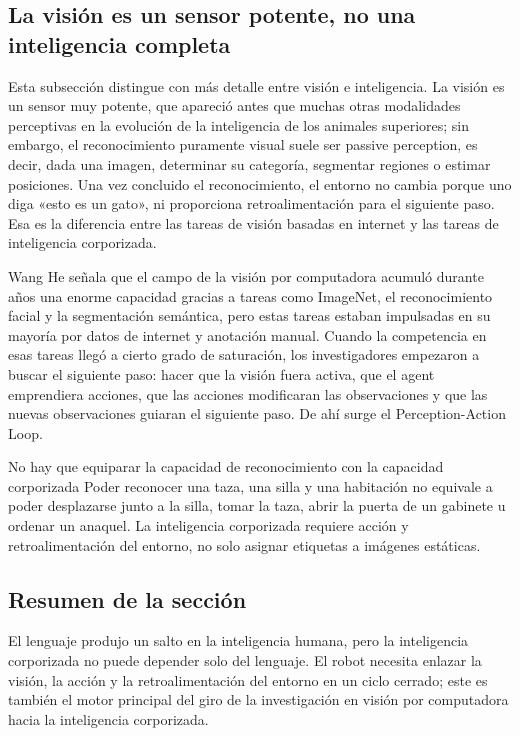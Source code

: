 \subsection{La visión es un sensor potente, no una inteligencia completa}

Esta subsección distingue con más detalle entre visión e inteligencia. La visión es un sensor muy potente, que apareció antes que muchas otras modalidades perceptivas en la evolución de la inteligencia de los animales superiores; sin embargo, el reconocimiento puramente visual suele ser passive perception, es decir, dada una imagen, determinar su categoría, segmentar regiones o estimar posiciones. Una vez concluido el reconocimiento, el entorno no cambia porque uno diga «esto es un gato», ni proporciona retroalimentación para el siguiente paso. Esa es la diferencia entre las tareas de visión basadas en internet y las tareas de inteligencia corporizada.

Wang He señala que el campo de la visión por computadora acumuló durante años una enorme capacidad gracias a tareas como ImageNet, el reconocimiento facial y la segmentación semántica, pero estas tareas estaban impulsadas en su mayoría por datos de internet y anotación manual. Cuando la competencia en esas tareas llegó a cierto grado de saturación, los investigadores empezaron a buscar el siguiente paso: hacer que la visión fuera activa, que el agent emprendiera acciones, que las acciones modificaran las observaciones y que las nuevas observaciones guiaran el siguiente paso. De ahí surge el Perception-Action Loop.

\begin{warningbox}{No hay que equiparar la capacidad de reconocimiento con la capacidad corporizada}
Poder reconocer una taza, una silla y una habitación no equivale a poder desplazarse junto a la silla, tomar la taza, abrir la puerta de un gabinete u ordenar un anaquel. La inteligencia corporizada requiere acción y retroalimentación del entorno, no solo asignar etiquetas a imágenes estáticas.
\end{warningbox}

\subsection{Resumen de la sección}

El lenguaje produjo un salto en la inteligencia humana, pero la inteligencia corporizada no puede depender solo del lenguaje. El robot necesita enlazar la visión, la acción y la retroalimentación del entorno en un ciclo cerrado; este es también el motor principal del giro de la investigación en visión por computadora hacia la inteligencia corporizada.

